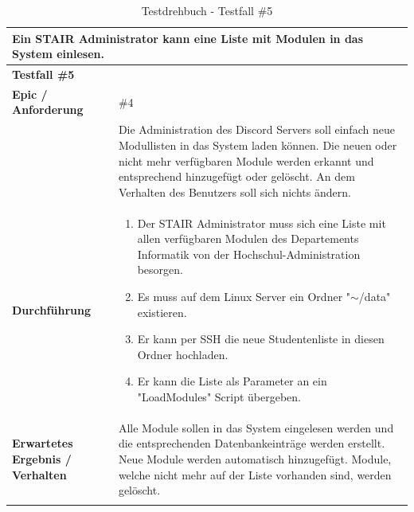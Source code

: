 \documentclass[a4paper, table]{article}
\begin{document}
\begin{longtable}[h]{|p{15em}|p{25em}|}
    \hline
    \multicolumn{2}{|l|}{\textbf{Ein STAIR Administrator kann eine Liste mit Modulen in das System einlesen.}} \\
    \hline
    \multicolumn{2}{|l|}{\textbf{Testfall \#5}} \\
    \hline
    \textbf{Epic / Anforderung} & \#4 \\*
     & Die Administration des Discord Servers soll einfach neue Modullisten in das System laden können.
     Die neuen oder nicht mehr verfügbaren Module werden erkannt und entsprechend hinzugefügt oder gelöscht.
     An dem Verhalten des Benutzers soll sich nichts ändern. \\
    \hline
    \textbf{Durchführung} &
    \begin{enumerate}
        \item Der STAIR Administrator muss sich eine Liste mit allen verfügbaren Modulen des Departements Informatik von der Hochschul-Administration besorgen.
        \item Es muss auf dem Linux Server ein Ordner "$\mathtt{\sim}$/data" existieren.
        \item Er kann per SSH die neue Studentenliste in diesen Ordner hochladen.
        \item Er kann die Liste als Parameter an ein "LoadModules" Script übergeben.
    \end{enumerate}\\
    \hline
    \textbf{Erwartetes Ergebnis / Verhalten} & Alle Module sollen in das System eingelesen werden und
    die entsprechenden Datenbankeinträge werden erstellt.
    Neue Module werden automatisch hinzugefügt.
    Module, welche nicht mehr auf der Liste vorhanden sind, werden gelöscht. \\
    \hline
    \caption{Testdrehbuch - Testfall \#5}
\end{longtable}
\end{document}
